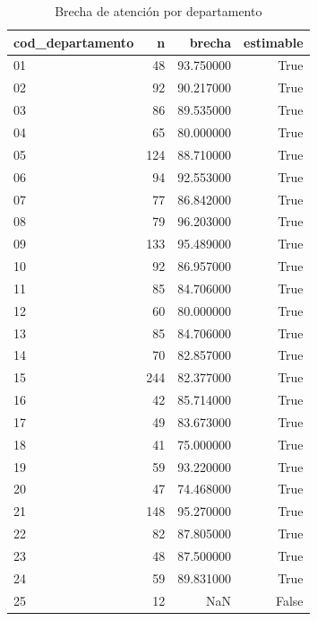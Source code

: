 \begin{table}[htbp]
\caption{Brecha de atención por departamento}
\label{tab:tabla_50_brecha_departamental}
\begin{tabular}{lrrr}
\toprule
cod\_departamento & n & brecha & estimable \\
\midrule
01 & 48 & 93.750000 & True \\
02 & 92 & 90.217000 & True \\
03 & 86 & 89.535000 & True \\
04 & 65 & 80.000000 & True \\
05 & 124 & 88.710000 & True \\
06 & 94 & 92.553000 & True \\
07 & 77 & 86.842000 & True \\
08 & 79 & 96.203000 & True \\
09 & 133 & 95.489000 & True \\
10 & 92 & 86.957000 & True \\
11 & 85 & 84.706000 & True \\
12 & 60 & 80.000000 & True \\
13 & 85 & 84.706000 & True \\
14 & 70 & 82.857000 & True \\
15 & 244 & 82.377000 & True \\
16 & 42 & 85.714000 & True \\
17 & 49 & 83.673000 & True \\
18 & 41 & 75.000000 & True \\
19 & 59 & 93.220000 & True \\
20 & 47 & 74.468000 & True \\
21 & 148 & 95.270000 & True \\
22 & 82 & 87.805000 & True \\
23 & 48 & 87.500000 & True \\
24 & 59 & 89.831000 & True \\
25 & 12 & NaN & False \\
\bottomrule
\end{tabular}
\end{table}
